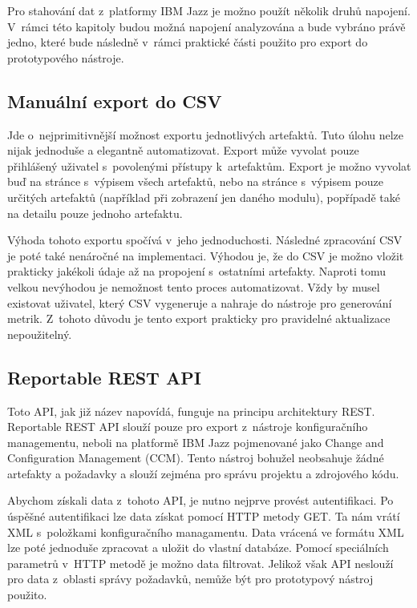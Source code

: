 \documentclass[czech,master]{diploma}
\begin{document}
Pro stahování dat z~platformy IBM Jazz je možno použít několik druhů napojení. V~rámci této kapitoly budou možná napojení analyzována a bude vybráno právě jedno, které bude následně v~rámci praktické části použito pro export do prototypového nástroje.

\subsection{Manuální export do CSV}
Jde o~nejprimitivnější možnost exportu jednotlivých artefaktů. Tuto úlohu nelze nijak jednoduše a elegantně automatizovat. Export může vyvolat pouze přihlášený uživatel s~povolenými přístupy k~artefaktům. Export je možno vyvolat buď na stránce s~výpisem všech artefaktů, nebo na stránce s~výpisem pouze určitých artefaktů (například při zobrazení jen daného modulu), popřípadě také na detailu pouze jednoho artefaktu.

Výhoda tohoto exportu spočívá v~jeho jednoduchosti. Následné zpracování CSV je poté také nenáročné na implementaci. Výhodou je, že do CSV je možno vložit prakticky jakékoli údaje až na propojení s~ostatními artefakty. Naproti tomu velkou nevýhodou je nemožnost tento proces automatizovat. Vždy by musel existovat uživatel, který CSV vygeneruje a nahraje do nástroje pro generování metrik. Z~tohoto důvodu je tento export prakticky pro pravidelné aktualizace nepoužitelný.

\subsection{Reportable REST API}
Toto API, jak již název napovídá, funguje na principu architektury REST. Reportable REST API slouží pouze pro export z~nástroje konfiguračního managementu, neboli na platformě IBM Jazz pojmenované jako Change and Configuration Management (CCM). Tento nástroj bohužel neobsahuje žádné artefakty a požadavky a slouží zejména pro správu projektu a zdrojového kódu.

Abychom získali data z~tohoto API, je nutno nejprve provést autentifikaci. Po úspěšné autentifikaci lze data získat pomocí HTTP metody GET. Ta nám vrátí XML s~položkami konfiguračního managamentu. Data vrácená ve formátu XML lze poté jednoduše zpracovat a uložit do vlastní databáze. Pomocí speciálních parametrů v~HTTP metodě je možno data filtrovat. Jelikož však API neslouží pro data z~oblasti správy požadavků, nemůže být pro prototypový nástroj použito.
\end{document}
